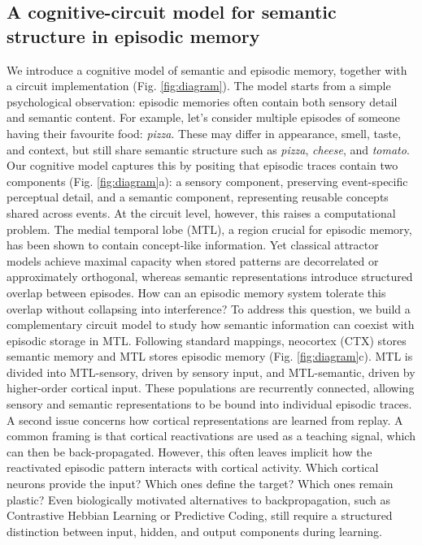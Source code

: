 \documentclass{article}
\begin{document}
\subsection*{A cognitive-circuit model for semantic structure in episodic memory}
We introduce a cognitive model of semantic and episodic memory, together with a circuit implementation (Fig. \ref{fig:diagram}). The model starts from a simple psychological observation: episodic memories often contain both sensory detail and semantic content. For example, let's consider multiple episodes of someone having their favourite food: \textit{pizza}. These may differ in appearance, smell, taste, and context, but still share semantic structure such as \textit{pizza}, \textit{cheese}, and \textit{tomato}. Our cognitive model captures this by positing that episodic traces contain two components (Fig. \ref{fig:diagram}a): a sensory component, preserving event-specific perceptual detail, and a semantic component, representing reusable concepts shared across events.
\newline\newline
At the circuit level, however, this raises a computational problem. The medial temporal lobe (MTL), a region crucial for episodic memory, has been shown to contain concept-like information. Yet classical attractor models achieve maximal capacity when stored patterns are decorrelated or approximately orthogonal, whereas semantic representations introduce structured overlap between episodes. How can an episodic memory system tolerate this overlap without collapsing into interference? To address this question, we build a complementary circuit model to study how semantic information can coexist with episodic storage in MTL. Following standard mappings, neocortex (CTX) stores semantic memory and MTL stores episodic memory (Fig. \ref{fig:diagram}c). MTL is divided into MTL-sensory, driven by sensory input, and MTL-semantic, driven by higher-order cortical input. These populations are recurrently connected, allowing sensory and semantic representations to be bound into individual episodic traces.
\newline\newline
A second issue concerns how cortical representations are learned from replay. A common framing is that cortical reactivations are used as a teaching signal, which can then be back-propagated. However, this often leaves implicit how the reactivated episodic pattern interacts with cortical activity. Which cortical neurons provide the input? Which ones define the target? Which ones remain plastic? Even biologically motivated alternatives to backpropagation, such as Contrastive Hebbian Learning or Predictive Coding, still require a structured distinction between input, hidden, and output components during learning.
\end{document}
